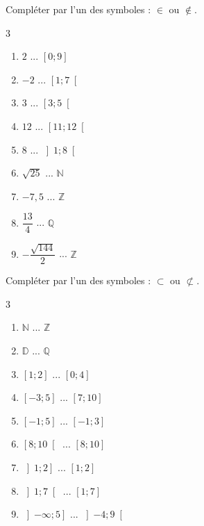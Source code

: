 {\newpage

\begin{Exercice}  Compléter par l'un des symboles : $\in$ ou $\notin$.

\begin{multicols}{3}
\begin{enumerate}
\item $2$ ... $\left[ 0 ; 9 \right]$ 
\item $-2$ ... $\left[ 1 ; 7 \right[$
\item $3$ ... $\left[ 3 ; 5 \right[$  
\item $12$ ... $\left[ 11 ; 12 \right[$
\item $8$ ... $\left] 1 ; 8 \right[$
\item $\sqrt{25}$ ... $\mathbb{N}$ 
\item $-7,5$ ... $\mathbb{Z}$ 
\item $\dfrac{13}{4}$ ... $\mathbb{Q}$   
\item $-\dfrac{\sqrt{144}}{2}$ ... $\mathbb{Z}$  
\end{enumerate}
\end{multicols} 

\end{Exercice}

\begin{Exercice}  Compléter par l'un des symboles : $\subset$ ou $\not\subset$.
\begin{multicols}{3}
\begin{enumerate}
\item $\mathbb{N}$ ... $\mathbb{Z}$ 
\item$\mathbb{D}$ ... $\mathbb{Q}$
\item$\left[ 1 ; 2 \right]$ ... $\left[ 0 ; 4 \right]$ 
\item$\left[ -3 ; 5 \right]$ ... $\left[ 7 ; 10 \right]$ 
\item$\left[ -1 ; 5 \right]$ ... $\left[ -1;3 \right]$ 
\item$\left[ 8 ; 10 \right[$ ... $\left[ 8 ; 10 \right]$ 
\item$\left] 1 ; 2 \right]$ ... $\left[ 1 ; 2 \right]$
\item$\left] 1 ; 7 \right[$ ... $\left[ 1 ; 7 \right]$ 
\item$\left] - \infty ; 5 \right]$ ... $\left] -4 ; 9\right[$ 

\end{enumerate} 
\end{multicols}
\end{Exercice}

}
